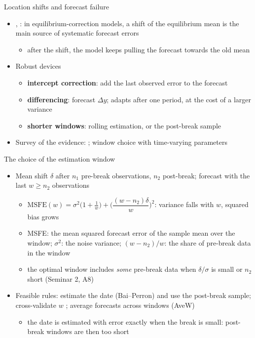 \begin{frame}{Location shifts and forecast failure}
\itemsize{\small}
\begin{itemize}
    \item {}, : in equilibrium-correction models, a shift of the equilibrium mean is the main source of systematic forecast errors
    \begin{itemize}
        \item after the shift, the model keeps pulling the forecast towards the old mean
    \end{itemize}
    \item Robust devices
    \begin{itemize}
        \item \textbf{intercept correction}: add the last observed error to the forecast
        \item \textbf{differencing}: forecast $\Delta y$; adapts after one period, at the cost of a larger variance
        \item \textbf{shorter windows}: rolling estimation, or the post-break sample
    \end{itemize}
    \item Survey of the evidence: ; window choice with time-varying parameters 
\end{itemize}
\end{frame}

\begin{frame}{The choice of the estimation window}
\itemsize{\small}
\begin{itemize}
    \item Mean shift $\delta$ after $n_1$ pre-break observations, $n_2$ post-break; forecast with the last $w \ge n_2$ observations 
    \begin{itemize}
        \item $\mathrm{MSFE}(w) = \sigma^2\big(1 + \tfrac1w\big) + \Big(\dfrac{(w - n_2)\delta}{w}\Big)^2$: variance falls with $w$, squared bias grows
        \item MSFE: the mean squared forecast error of the sample mean over the window; $\sigma^2$: the noise variance; $(w - n_2)/w$: the share of pre-break data in the window
        \item the optimal window includes \emph{some} pre-break data when $\delta/\sigma$ is small or $n_2$ short (Seminar 2, A8)
    \end{itemize}
    \item Feasible rules: estimate the date (Bai--Perron) and use the post-break sample; cross-validate $w$ ; average forecasts across windows (AveW) 
    \begin{itemize}
        \item the date is estimated with error exactly when the break is small: post-break windows are then too short
    \end{itemize}
\end{itemize}
\end{frame}

